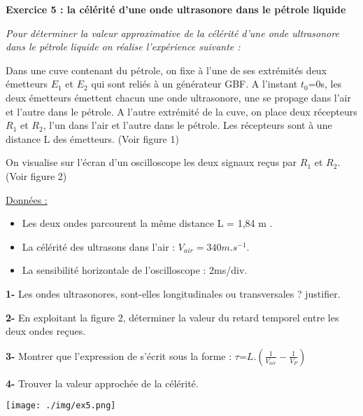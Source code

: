 \documentclass[12pt, french]{article}
\begin{document}
\begin{Box2}{\textbf{Exercice 5 : la célérité d’une onde ultrasonore dans le pétrole
liquide }}

\emph{Pour déterminer la valeur approximative de la célérité d’une onde ultrasonore dans le pétrole
liquide on réalise l’expérience suivante :}

Dans une cuve contenant du pétrole, on fixe à l’une de ses extrémités deux émetteurs $E_1$ et $E_2$ qui
sont reliés à un générateur GBF. A l’instant $t_0$=0s, les deux émetteurs émettent chacun une onde
ultrasonore, une se propage dans l’air et l’autre dans le pétrole. A l’autre extrémité de la cuve, on
place deux récepteurs $R_1$ et $R_2$, l’un dans l’air et l’autre dans le pétrole. Les récepteurs sont à une
distance L des émetteurs. (Voir figure 1)

On visualise sur l’écran d’un oscilloscope les deux signaux reçus par $R_1$ et $R_2$. (Voir figure 2)

\underline{Données :} 
\begin{itemize}
	\item Les deux ondes parcourent la même distance L = 1,84 m .
	\item La célérité des ultrasons dans l’air : $V_{air} = 340 m.s^{-1}$.
	\item La sensibilité horizontale de l’oscilloscope : 2ms/div.
\end{itemize}

\textbf{1- }Les ondes ultrasonores, sont-elles longitudinales ou transversales ? justifier.

\textbf{2- }En exploitant la figure 2, déterminer la valeur du retard temporel entre les deux ondes reçues.

\textbf{3- }Montrer que l’expression de s’écrit sous la forme : $\tau$=$L.(\frac{1}{V_{air}} - \frac{1}{V_P})$

\textbf{4- }Trouver la valeur approchée de la célérité.
 \begin{center}
	\texttt{[image: ./img/ex5.png]}
  \end{center}
\end{Box2}
\end{document}
